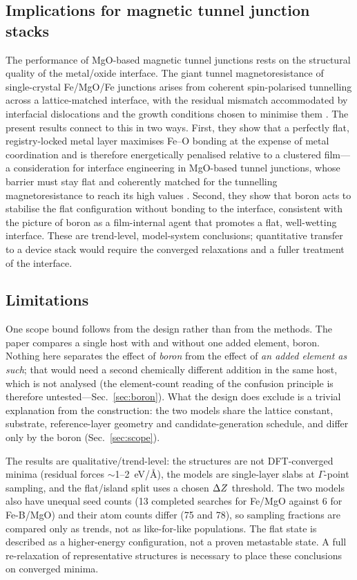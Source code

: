 \subsection{Implications for magnetic tunnel junction stacks}
\label{sec:mtj}

The performance of MgO-based magnetic tunnel junctions rests on the structural quality of the
metal/oxide interface. The giant tunnel magnetoresistance of single-crystal Fe/MgO/Fe junctions
arises from coherent spin-polarised tunnelling across a lattice-matched interface, with the residual
mismatch accommodated by interfacial dislocations and the growth conditions chosen to minimise them
\cite{yuasa2004}. The present results connect to this in two ways. First, they show that a perfectly
flat, registry-locked metal layer maximises Fe--O bonding at the expense of metal coordination and is
therefore energetically penalised relative to a clustered film---a consideration for interface
engineering in MgO-based tunnel junctions, whose barrier must stay flat and coherently matched for
the tunnelling magnetoresistance to reach its high values \cite{yuasa2004}. Second, they show that
boron acts to stabilise the flat configuration without bonding to the interface, consistent with the
picture of boron as a film-internal agent that promotes a flat, well-wetting interface.
These are trend-level, model-system conclusions; quantitative transfer to a device stack would
require the converged relaxations and a fuller treatment of the interface.

\subsection{Limitations}
\label{sec:limitations}

One scope bound follows from the design rather than from the methods. The paper compares a single
host with and without one added element, boron. Nothing here separates the effect of \emph{boron}
from the effect of \emph{an added element as such}; that would need a second chemically different
addition in the same host, which is not analysed (the element-count reading of the confusion
principle is therefore untested---Sec.~\ref{sec:boron}). What the design does exclude is a trivial
explanation from the construction: the two models share the lattice constant, substrate,
reference-layer geometry and candidate-generation schedule, and differ only by the boron
(Sec.~\ref{sec:scope}).

The results are qualitative/trend-level: the structures are not DFT-converged minima (residual
forces $\sim$1--2~eV/\AA), the models are single-layer slabs at $\Gamma$-point sampling, and the
flat/island split uses a chosen $\Delta Z$ threshold. The two models also have unequal seed counts (13
completed searches for Fe/MgO against 6 for Fe-B/MgO) and their atom counts differ (75 and 78), so
sampling fractions are compared only as trends, not as like-for-like populations. The flat state is
described as a higher-energy configuration, not a proven metastable state. A full re-relaxation of
representative structures is necessary to place these conclusions on converged minima.

